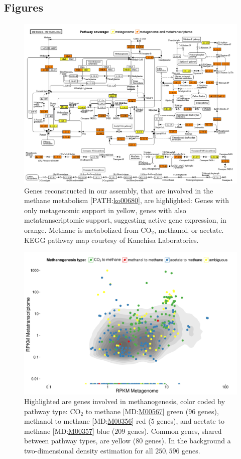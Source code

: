 \documentclass{bmcart}
\begin{document}
\begin{backmatter}
\section*{Figures}
\begin{figure}[h!]
\centering
\includegraphics[width=.9\textwidth]{Fig1.png}
\caption{
Genes reconstructed in our assembly, that are involved in the methane metabolism [PATH:\href{http://www.genome.jp/kegg-bin/show_pathway?ko00680}{ko00680}], are highlighted: Genes with only metagenomic support in yellow, genes with also metatranscriptomic support, suggesting active gene expression, in orange.
Methane is metabolized from CO$_{\text{2}}$, methanol, or acetate.
KEGG pathway map courtesy of Kanehisa Laboratories.}
\label{fPathway}
\end{figure}
\begin{figure}[h!]
\centering
\includegraphics[width=.9\textwidth]{Fig2.pdf}
\caption{
Highlighted are genes involved in methanogenesis, color coded by pathway type: CO$_{\text{2}}$ to methane [MD:\href{http://www.kegg.jp/kegg-bin/show_module?M00567}{M00567}] green ($96$ genes), methanol to methane [MD:\href{http://www.kegg.jp/kegg-bin/show_module?M00356}{M00356}] red ($5$ genes), and acetate to methane [MD:\href{http://www.kegg.jp/kegg-bin/show_module?M00357}{M00357}] blue ($209$ genes).
Common genes, shared between pathway types, are yellow ($80$ genes).
In the background a two-dimensional density estimation for all $250,596$ genes.}
\label{fCoverage}
\end{figure}


\end{backmatter}
\end{document}
